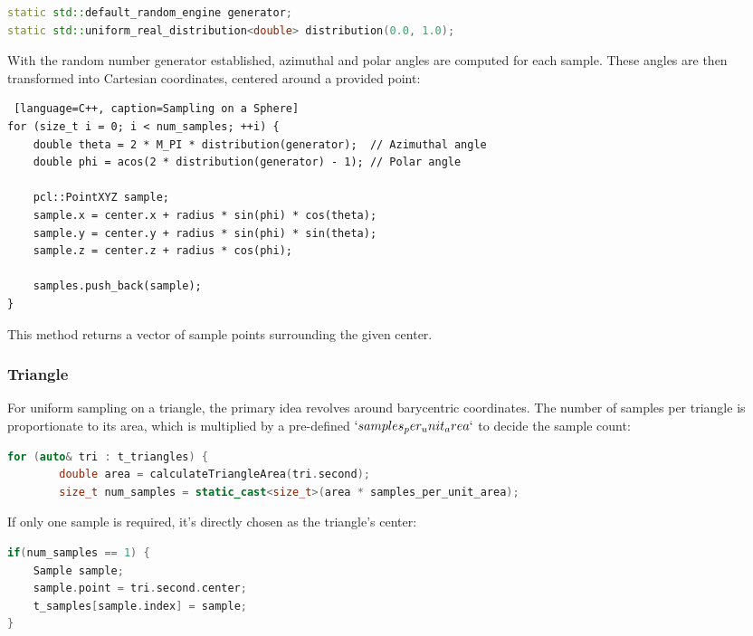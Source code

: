 \documentclass[11pt, a4paper,oneside,chapterprefix=false]{scrbook}
\begin{document}
\begin{lstlisting}[language=C++, caption=Spherical Sampling Initialization]
static std::default_random_engine generator;
static std::uniform_real_distribution<double> distribution(0.0, 1.0);
\end{lstlisting}

With the random number generator established, azimuthal and polar angles are computed for each sample. These angles are then transformed into Cartesian coordinates, centered around a provided point:

\begin{lstlisting} [language=C++, caption=Sampling on a Sphere]
for (size_t i = 0; i < num_samples; ++i) {
	double theta = 2 * M_PI * distribution(generator);  // Azimuthal angle
	double phi = acos(2 * distribution(generator) - 1); // Polar angle

	pcl::PointXYZ sample;
	sample.x = center.x + radius * sin(phi) * cos(theta);
	sample.y = center.y + radius * sin(phi) * sin(theta);
	sample.z = center.z + radius * cos(phi);

	samples.push_back(sample);
}
\end{lstlisting}

This method returns a vector of sample points surrounding the given center.

\subsubsection{Triangle}

For uniform sampling on a triangle, the primary idea revolves around barycentric coordinates. The number of samples per triangle is proportionate to its area, which is multiplied by a pre-defined $`samples_per_unit_area`$ to decide the sample count:

\begin{lstlisting}[language=C++, caption=Triangle Sampling Initialization]
    for (auto& tri : t_triangles) {
        double area = calculateTriangleArea(tri.second);
        size_t num_samples = static_cast<size_t>(area * samples_per_unit_area);
\end{lstlisting}

If only one sample is required, it's directly chosen as the triangle's center:

\begin{lstlisting}[language=C++, caption=Triangle Center Sampling]
if(num_samples == 1) {
	Sample sample;
	sample.point = tri.second.center;
	t_samples[sample.index] = sample;
}
\end{lstlisting}
\end{document}
